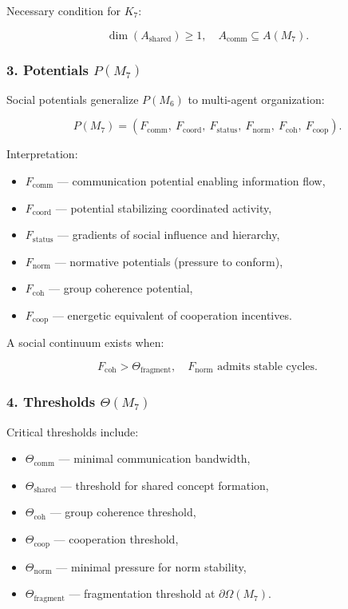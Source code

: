 Necessary condition for $K_7$:

\[
\dim(A_{\mathrm{shared}})\ge 1,\quad
A_{\mathrm{comm}}\subseteq A(M_7).
\]

\subsubsection*{3. Potentials \texorpdfstring{$P(M_7)$}{P(M_7)}}

Social potentials generalize $P(M_6)$ to multi-agent organization:

\[
P(M_7)=
(F_{\mathrm{comm}},\
F_{\mathrm{coord}},\
F_{\mathrm{status}},\
F_{\mathrm{norm}},\
F_{\mathrm{coh}},\
F_{\mathrm{coop}}).
\]

Interpretation:

\begin{itemize}
    \item $F_{\mathrm{comm}}$ — communication potential enabling information flow,
    \item $F_{\mathrm{coord}}$ — potential stabilizing coordinated activity,
    \item $F_{\mathrm{status}}$ — gradients of social influence and hierarchy,
    \item $F_{\mathrm{norm}}$ — normative potentials (pressure to conform),
    \item $F_{\mathrm{coh}}$ — group coherence potential,
    \item $F_{\mathrm{coop}}$ — energetic equivalent of cooperation incentives.
\end{itemize}

A social continuum exists when:

\[
F_{\mathrm{coh}} > \Theta_{\mathrm{fragment}},
\quad F_{\mathrm{norm}} \text{ admits stable cycles}.
\]

\subsubsection*{4. Thresholds \texorpdfstring{$\Theta(M_7)$}{\Theta(M_7)}}

Critical thresholds include:

\begin{itemize}
    \item $\Theta_{\mathrm{comm}}$ — minimal communication bandwidth,
    \item $\Theta_{\mathrm{shared}}$ — threshold for shared concept formation,
    \item $\Theta_{\mathrm{coh}}$ — group coherence threshold,
    \item $\Theta_{\mathrm{coop}}$ — cooperation threshold,
    \item $\Theta_{\mathrm{norm}}$ — minimal pressure for norm stability,
    \item $\Theta_{\mathrm{fragment}}$ — fragmentation threshold at $\partial\Omega(M_7)$.
\end{itemize}

